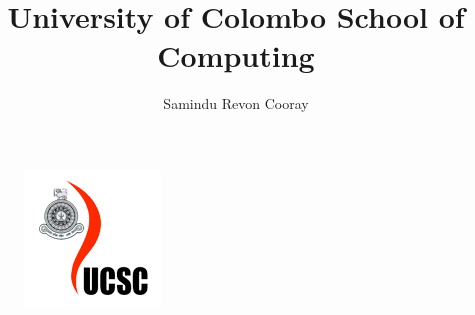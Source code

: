 \documentclass{article}
\title{University of Colombo School of Computing}
\author{Samindu Revon Cooray}
\begin{document}
\maketitle
\begin{figure}[t]
	\centering
	\includegraphics{UCSC}
\end{figure}
\end{document}
